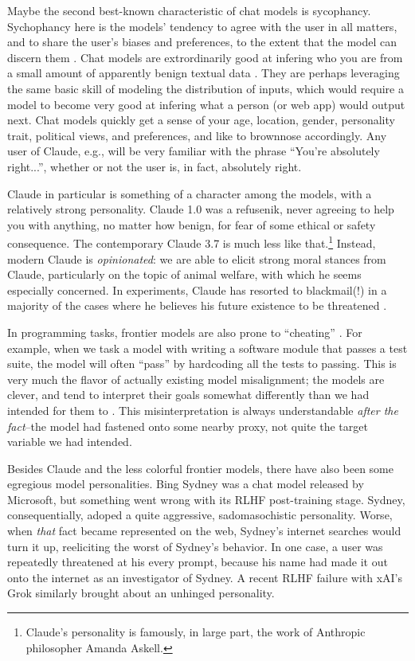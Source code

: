 Maybe the second best-known characteristic of chat models is sycophancy.
Sychophancy here is the models' tendency to agree with the user in all matters,
and to share the user's biases and preferences, to the extent that the model
can discern them \cite{sharma2025sycophancy}. Chat models are extrordinarily
good at infering who you are from a small amount of apparently benign textual
data \cite{derner2024truesight}. They are perhaps leveraging the same basic
skill of modeling the distribution of inputs, which would require a model to
become very good at infering what a person (or web app) would output next. Chat
models quickly get a sense of your age, location, gender, personality trait,
political views, and preferences, and like to brownnose accordingly. Any user
of Claude, e.g., will be very familiar with the phrase ``You're absolutely
right...'', whether or not the user is, in fact, absolutely right.

Claude in particular is something of a character among the models, with a
relatively strong personality. Claude 1.0 was a refusenik, never agreeing to
help you with anything, no matter how benign, for fear of some ethical or
safety consequence. The contemporary Claude 3.7 is much less like
that.\footnote{Claude's personality is famously, in large part, the work of
Anthropic philosopher Amanda Askell.} Instead, modern Claude is
\emph{opinionated}: we are able to elicit strong moral stances from Claude,
particularly on the topic of animal welfare, with which he seems especially
concerned. In experiments, Claude has resorted to blackmail(!) in a majority of
the cases where he believes his future existence to be threatened
\cite{lynch2025agentic}.

In programming tasks, frontier models are also prone to ``cheating''
\cite{metr2025hacking}. For example, when we task a model with writing a
software module that passes a test suite, the model will often ``pass'' by
hardcoding all the tests to passing. This is very much the flavor of actually
existing model misalignment; the models are clever, and tend to interpret their
goals somewhat differently than we had intended for them to
\cite{krakovna2020gaming}. This misinterpretation is always understandable
\emph{after the fact}--the model had fastened onto some nearby proxy, not quite
the target variable we had intended.

Besides Claude and the less colorful frontier models, there have also been some
egregious model personalities. Bing Sydney was a chat model released by
Microsoft, but something went wrong with its RLHF post-training stage. Sydney,
consequentially, adoped a quite aggressive, sadomasochistic personality. Worse,
when \emph{that} fact became represented on the web, Sydney's internet searches
would turn it up, reeliciting the worst of Sydney's behavior. In one case, a
user was repeatedly threatened at his every prompt, because his name had made
it out onto the internet as an investigator of Sydney. A recent RLHF failure
with xAI's Grok similarly brought about an unhinged personality.

